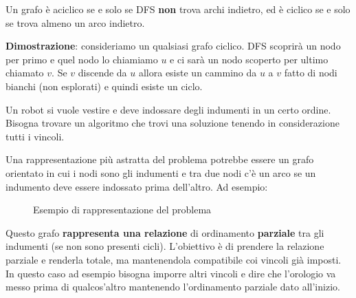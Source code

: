 \documentclass[a4paper]{article}
\begin{document}
\begin{theorem}
  Un grafo è aciclico se e solo se DFS \textbf{non} trova archi indietro, ed è ciclico
  se e solo se trova almeno un arco indietro.

  \vspace{1em}
  \noindent
  \textbf{Dimostrazione}: consideriamo un qualsiasi grafo ciclico. DFS scoprirà un nodo
  per primo e quel nodo lo chiamiamo \( u \) e ci sarà un nodo scoperto per ultimo
  chiamato \( v \). Se \( v \) discende da \( u \) allora esiste un cammino da \( u \) a
  \( v \) fatto di nodi bianchi (non esplorati) e quindi esiste un ciclo.
\end{theorem}

\begin{example}
  Un robot si vuole vestire e deve indossare degli indumenti in un certo ordine. Bisogna
  trovare un algoritmo che trovi una soluzione tenendo in considerazione tutti i vincoli.

  Una rappresentazione più astratta del problema potrebbe essere un grafo orientato
  in cui i nodi sono gli indumenti e tra due nodi c'è un arco se un indumento deve essere
  indossato prima dell'altro. Ad esempio:
  \begin{figure}[H]
    \centering
    \caption{Esempio di rappresentazione del problema}
  \end{figure}
  \noindent
  Questo grafo \textbf{rappresenta una relazione} di ordinamento \textbf{parziale} tra gli indumenti
  (se non sono presenti cicli). L'obiettivo è di prendere la relazione parziale e renderla
  totale, ma mantenendola compatibile coi vincoli già imposti. In questo caso ad esempio
  bisogna imporre altri vincoli e dire che l'orologio va messo prima di qualcos'altro
  mantenendo l'ordinamento parziale dato all'inizio.


\end{example}
\end{document}
